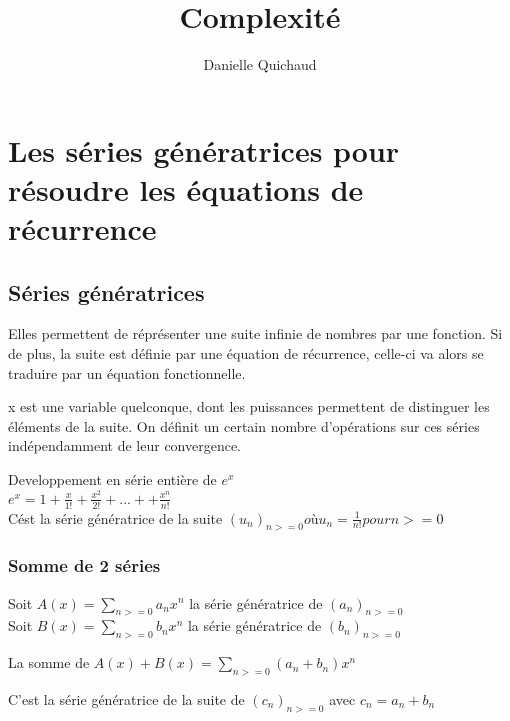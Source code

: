 \providecommand{\VarRectoVerso}{\oneside}

\title{Complexité}
\author{Danielle Quichaud}

\maketitle
\tableofcontents
\section{Les séries génératrices pour résoudre les équations de récurrence}
\subsection{Séries génératrices}
Elles permettent de réprésenter une suite infinie de nombres par une fonction. Si de plus, la suite est définie par une équation de récurrence, celle-ci va alors se traduire par un équation fonctionnelle.


x est une variable quelconque, dont les puissances permettent de distinguer les éléments de la suite.
On définit un certain nombre d'opérations sur ces séries indépendamment de leur convergence.


\exemple
Developpement en série entière de $e^x$
\\$e^x = 1 + \frac{x}{1!} + \frac{x^2}{2!} + ... + + \frac{x^n}{n!}$
\\
C\'est la série génératrice de la suite $(u_n)_{n>=0} où u_n = \frac{1}{n!} pour n>=0$

\subsubsection{Somme de 2 séries}

Soit $A(x)=\sum_{n>=0}^{} a_n x^n$ la série génératrice de $(a_n)_{n>=0}$\\
Soit $B(x)=\sum_{n>=0}^{} b_n x^n$ la série génératrice de $(b_n)_{n>=0}$

La somme de $A(x) + B(x) = \sum_{n>=0}^{} (a_n + b_n)x^n$

C'est la série génératrice de la suite de $(c_n)_{n>=0}$ avec $c_n = a_n + b_n$

